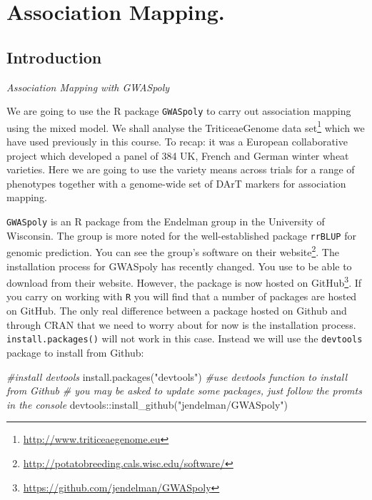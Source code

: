 \documentclass[
]{book}
\newenvironment{Shaded}{\begin{snugshade}}{\end{snugshade}}
\newcommand{\CommentTok}[1]{\textcolor[rgb]{0.56,0.35,0.01}{\textit{#1}}}
\newcommand{\FunctionTok}[1]{\textcolor[rgb]{0.00,0.00,0.00}{#1}}
\newcommand{\NormalTok}[1]{#1}
\newcommand{\SpecialCharTok}[1]{\textcolor[rgb]{0.00,0.00,0.00}{#1}}
\newcommand{\StringTok}[1]{\textcolor[rgb]{0.31,0.60,0.02}{#1}}
\renewcommand{\href}[2]{#2\footnote{\url{#1}}}
\begin{document}
\hypertarget{Association-mapping}{%
\chapter{Association Mapping.}\label{Association-mapping}}

\hypertarget{introduction-1}{%
\section{Introduction}\label{introduction-1}}

\emph{Association Mapping with GWASpoly}

We are going to use the R package \texttt{GWASpoly} to carry out association mapping using the mixed model. We shall analyse the \href{http://www.triticeaegenome.eu}{TriticeaeGenome data set} which we have used previously in this course. To recap: it was a European collaborative project which developed a panel of 384 UK, French and German winter wheat varieties. Here we are going to use the variety means across trials for a range of phenotypes together with a genome-wide set of DArT markers for association mapping.

\texttt{GWASpoly} is an R package from the Endelman group in the University of Wisconsin. The group is more noted for the well-established package \texttt{rrBLUP} for genomic prediction. You can see the group's software on their \href{http://potatobreeding.cals.wisc.edu/software/}{website}. The installation process for GWASpoly has recently changed. You use to be able to download from their website. However, the package is now hosted on \href{https://github.com/jendelman/GWASpoly}{GitHub}. If you carry on working with \texttt{R} you will find that a number of packages are hosted on GitHub. The only real difference between a package hosted on Github and through CRAN that we need to worry about for now is the installation process. \texttt{install.packages()} will not work in this case. Instead we will use the \texttt{devtools} package to install from Github:

\begin{Shaded}
\begin{Highlighting}[]
\CommentTok{\#install devtools}
\FunctionTok{install.packages}\NormalTok{(}\StringTok{"devtools"}\NormalTok{) }
\CommentTok{\#use devtools function to install from Github}
\CommentTok{\# you may be asked to update some packages, just follow the promts in the console}
\NormalTok{devtools}\SpecialCharTok{::}\FunctionTok{install\_github}\NormalTok{(}\StringTok{"jendelman/GWASpoly"}\NormalTok{)}
\end{Highlighting}
\end{Shaded}
\end{document}
